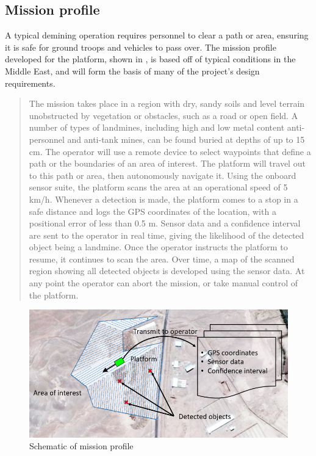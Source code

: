 \documentclass[main.tex]{subfiles}
\begin{document}


\subsection{Mission profile}
A typical demining operation requires personnel to clear a path or area, ensuring it is safe for ground troops and vehicles to pass over. The mission profile developed for the platform, shown in , is based off of typical conditions in the Middle East, and will form the basis of many of the project's design requirements.
\begin{quote}The mission takes place in a region with dry, sandy soils and level terrain unobstructed by vegetation or obstacles, such as a road or open field. A number of types of landmines, including high and low metal content anti-personnel and anti-tank mines, can be found buried at depths of up to 15 cm. The operator will use a remote device to select waypoints that define a path or the boundaries of an area of interest. The platform will travel out to this path or area, then autonomously navigate it. Using the onboard sensor suite, the platform scans the area at an operational speed of 5 km/h. Whenever a detection is made, the platform comes to a stop in a safe distance and logs the GPS coordinates of the location, with a positional error of less than 0.5 m. Sensor data and a confidence interval are sent to the operator in real time, giving the likelihood of the detected object being a landmine. Once the operator instructs the platform to resume, it continues to scan the area. Over time, a map of the scanned region showing all detected objects is developed using the sensor data. At any point the operator can abort the mission, or take manual control of the platform.
\end{quote}

\begin{figure}[ht]
\centering
\includegraphics[width=\textwidth]{1-Introduction/SoO.PNG}
\caption{Schematic of mission profile}
\end{figure}
\end{document}
